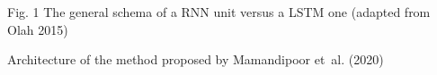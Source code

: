 Fig. 1 The general schema of a RNN unit versus a LSTM one (adapted from Olah 2015)

Architecture of the method proposed by Mamandipoor et al. (2020)


